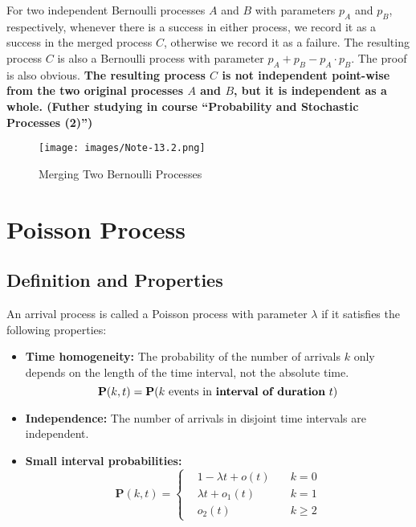 \documentclass[device=normal, lang=en]{elegantbook}
\numberwithin{equation}{section}
\begin{document}
For two independent Bernoulli processes $A$ and $B$ with parameters $p_A$ and $p_B$, respectively, whenever there is a success in either process, we record it as a success in the merged process $C$, otherwise we record it as a failure. The resulting process $C$ is also a Bernoulli process with parameter $p_A + p_B - p_A \cdot p_B$.  The proof is also obvious. \textbf{The resulting process $C$ is not independent point-wise from the two original processes $A$ and $B$, but it is independent as a whole. (Futher studying in course ``Probability and Stochastic Processes (2)'')}
\begin{figure}[H]
    \centering
    \texttt{[image: images/Note-13.2.png]}
    \caption{Merging Two Bernoulli Processes}
\end{figure}


\section{Poisson Process}
\subsection{Definition and Properties}
\begin{definition}
    An arrival process is called a Poisson process with parameter $\lambda$ if it satisfies the following properties:
    \begin{itemize}
        \item \textbf{Time homogeneity:} The probability of the number of arrivals $k$ only depends on the length of the time interval, not the absolute time.
        \begin{equation}
            \mathbf{P}(k, t) = \mathbf{P}(k \text{ events in \textbf{interval of duration} } t)
        \end{equation}
        \item \textbf{Independence:} The number of arrivals in disjoint time intervals are independent.
        \item \textbf{Small interval probabilities:} 
        \begin{equation}
            \mathbf{P}(k, t) = \left\{\begin{aligned}
                & 1 - \lambda t + o(t) &\quad k = 0 \\
                & \lambda t + o_1(t) &\quad k = 1 \\
                & o_2(t) &\quad k \geq 2
            \end{aligned}\right.
        \end{equation}
    \end{itemize}
\end{definition}
\end{document}
